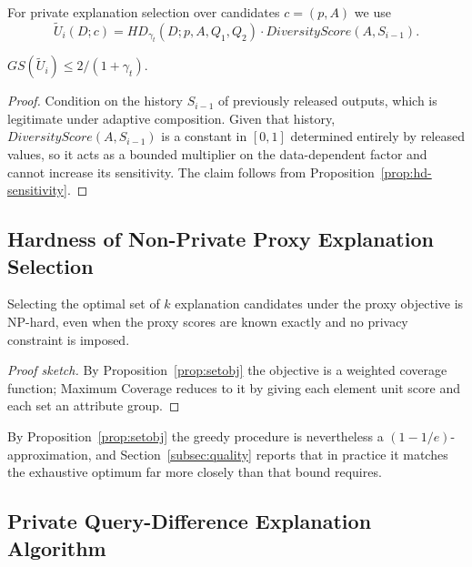 For private explanation selection over candidates $c=(p,A)$ we use
\begin{equation}
\widetilde{U}_i(D;c)=HD_{\gamma_t}(D;p,A,Q_1,Q_2)\cdot DiversityScore(A,S_{i-1}).
\label{eq:selection-utility}
\end{equation}

\begin{proposition}
\label{prop:selection-utility-sensitivity}
$GS(\widetilde{U}_i)\le 2/(1+\gamma_t)$.
\end{proposition}

\begin{proof}
Condition on the history $S_{i-1}$ of previously released outputs, which is legitimate under adaptive composition.
Given that history, $DiversityScore(A,S_{i-1})$ is a constant in $[0,1]$ determined entirely by released values, so it acts as a bounded multiplier on the data-dependent factor and cannot increase its sensitivity.
The claim follows from Proposition~\ref{prop:hd-sensitivity}.
\end{proof}

\subsection{Hardness of Non-Private Proxy Explanation Selection}
\label{subsec:non-private-hardness}

\begin{theorem}
\label{thm:non-private-hardness}
Selecting the optimal set of $k$ explanation candidates under the proxy objective is NP-hard, even when the proxy scores are known exactly and no privacy constraint is imposed.
\end{theorem}

\begin{proof}[Proof sketch]
By Proposition~\ref{prop:setobj} the objective is a weighted coverage function; Maximum Coverage reduces to it by giving each element unit score and each set an attribute group.
\end{proof}

By Proposition~\ref{prop:setobj} the greedy procedure is nevertheless a $(1-1/e)$-approximation, and Section~\ref{subsec:quality} reports that in practice it matches the exhaustive optimum far more closely than that bound requires.

\subsection{Private Query-Difference Explanation Algorithm}
\label{subsec:private-algorithm}

